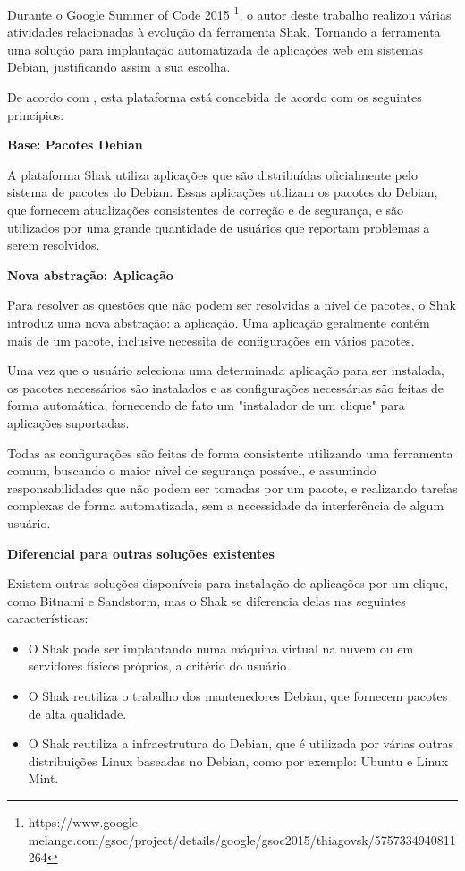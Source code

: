 Durante o Google Summer of Code 2015 \footnote{https://www.google-melange.com/gsoc/project/details/google/gsoc2015/thiagovsk/5757334940811264}, o autor deste trabalho realizou 
várias atividades relacionadas à evolução da ferramenta Shak. Tornando a ferramenta uma
 solução para implantação automatizada de aplicações web em sistemas Debian, 
justificando assim a sua escolha.

De acordo com , esta plataforma está concebida de acordo 
com os seguintes princípios:

\textbf{Base: Pacotes Debian}

A plataforma Shak utiliza aplicações que são distribuídas oficialmente pelo sistema de pacotes do Debian. Essas aplicações utilizam os
pacotes do Debian, que fornecem atualizações consistentes de correção e de segurança,
e são utilizados por uma grande quantidade de usuários que reportam problemas a
serem resolvidos. 

\textbf{Nova abstração: Aplicação}

Para resolver as questões que não podem ser resolvidas a nível de pacotes, o
Shak introduz uma nova abstração: a aplicação. Uma aplicação geralmente
contém mais de um pacote, inclusive necessita de configurações em vários pacotes.

Uma vez que o usuário seleciona uma determinada aplicação para
ser instalada, os pacotes necessários são instalados e as configurações
necessárias são feitas de forma automática, fornecendo de fato um "instalador
de um clique" para aplicações suportadas. 

Todas as configurações são feitas de
forma consistente utilizando uma ferramenta comum, buscando o maior nível de
segurança possível, e assumindo responsabilidades que não podem ser tomadas por
um pacote, e realizando tarefas complexas de forma automatizada, sem a necessidade
da interferência de algum usuário.

\textbf{Diferencial para outras soluções existentes}

Existem outras soluções disponíveis para instalação de aplicações por um clique,
como Bitnami e Sandstorm, mas o Shak se
diferencia delas nas seguintes características:

\begin{itemize}
  \item O Shak pode ser implantando numa máquina virtual na nuvem ou em servidores físicos
    próprios, a critério do usuário.

  \item O Shak reutiliza o trabalho dos mantenedores Debian, que fornecem pacotes
    de alta qualidade.

  \item O Shak reutiliza a infraestrutura do Debian, que é utilizada por várias
outras distribuições Linux baseadas no Debian, como por exemplo: Ubuntu e Linux Mint.

\end{itemize}

